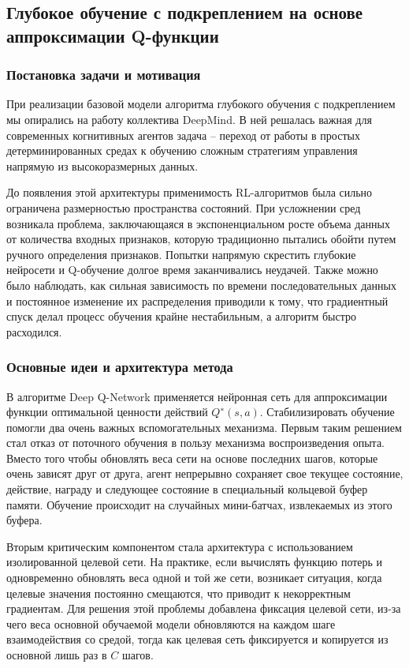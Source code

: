 \subsection{Глубокое обучение с подкреплением на основе аппроксимации Q-функции}

\subsubsection{Постановка задачи и мотивация}

При реализации базовой модели алгоритма глубокого обучения с подкреплением мы опирались на работу \cite{mnih2015humanlevel} коллектива DeepMind. В ней решалась важная для современных когнитивных агентов задача -- переход от работы в простых детерминированных средах к обучению сложным стратегиям управления напрямую из высокоразмерных данных.

До появления этой архитектуры применимость RL-алгоритмов была сильно ограничена размерностью пространства состояний. При усложнении сред возникала проблема, заключающаяся в экспоненциальном росте объема данных от количества входных признаков, которую традиционно пытались обойти путем ручного определения признаков. Попытки напрямую скрестить глубокие нейросети и Q-обучение долгое время заканчивались неудачей. Также можно было наблюдать, как сильная зависимость по времени последовательных данных и постоянное изменение их распределения приводили к тому, что градиентный спуск делал процесс обучения крайне нестабильным, а алгоритм быстро расходился.

\subsubsection{Основные идеи и архитектура метода}

В алгоритме Deep Q-Network применяется нейронная сеть для аппроксимации функции оптимальной ценности действий $Q^∗(s,a)$. Стабилизировать обучение помогли два очень важных вспомогательных механизма. Первым таким решением стал отказ от поточного обучения в пользу механизма воспроизведения опыта. Вместо того чтобы обновлять веса сети на основе последних шагов, которые очень зависят друг от друга, агент непрерывно сохраняет свое текущее состояние, действие, награду и следующее состояние в специальный кольцевой буфер памяти. Обучение происходит на случайных мини-батчах, извлекаемых из этого буфера.

Вторым критическим компонентом стала архитектура с использованием изолированной целевой сети. На практике, если вычислять функцию потерь и одновременно обновлять веса одной и той же сети, возникает ситуация, когда целевые значения постоянно смещаются, что приводит к некорректным градиентам. Для решения этой проблемы добавлена фиксация целевой сети, из-за чего веса основной обучаемой модели обновляются на каждом шаге взаимодействия со средой, тогда как целевая сеть фиксируется и копируется из основной лишь раз в $C$ шагов.

